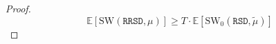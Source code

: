 \documentclass[letterpaper,11pt]{article}
\newcommand{\E}{\mathbb{E}}
\newcommand{\SW}{\textrm{SW}}
\begin{document}
\begin{proof}
       \begin{equation}\label{eq:lbd-rrsd}
       \E[\SW(\texttt{RRSD}, \mu)]  \ge T \cdot \E[\SW_0(\texttt{RSD}, \tilde{\mu})]
       \end{equation}
      

       
        
      
      

\end{proof}
\end{document}
